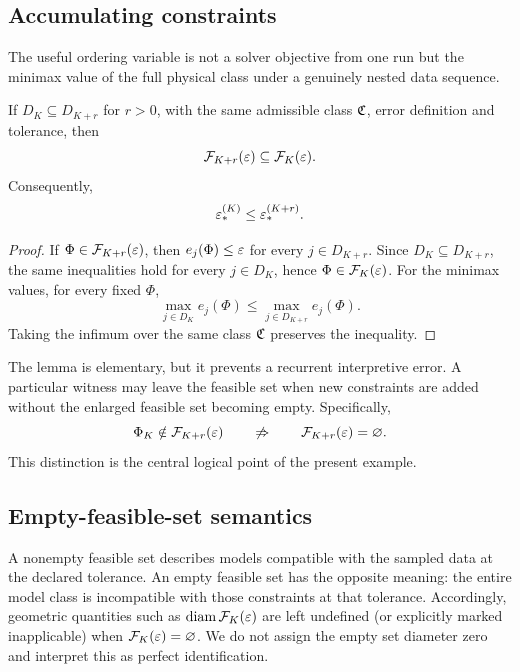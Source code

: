 \subsection{Accumulating constraints}

The useful ordering variable is not a solver objective from one run but the minimax value of the full physical class under a genuinely nested data sequence.

\begin{lemma}
\label{lem:nesting}
If $D_K\subseteq D_{K+r}$ for $r>0$, with the same admissible class $\mathfrak C$, error definition and tolerance, then
\begin{equation}
\mathcal F_{K+r}(\varepsilon)\subseteq\mathcal F_K(\varepsilon).
\label{eq:set-nesting}
\end{equation}
Consequently,
\begin{equation}
\varepsilon_*^{(K)}\le\varepsilon_*^{(K+r)}.
\label{eq:minimax-monotonicity}
\end{equation}
\end{lemma}

\begin{proof}
If $\Phi\in\mathcal F_{K+r}(\varepsilon)$, then $e_j(\Phi)\le\varepsilon$ for every $j\in D_{K+r}$.  Since $D_K\subseteq D_{K+r}$, the same inequalities hold for every $j\in D_K$, hence $\Phi\in\mathcal F_K(\varepsilon)$.  For the minimax values, for every fixed $\Phi$,
\[
\max_{j\in D_K}e_j(\Phi)
\le
\max_{j\in D_{K+r}}e_j(\Phi).
\]
Taking the infimum over the same class $\mathfrak C$ preserves the inequality.
\end{proof}

The lemma is elementary, but it prevents a recurrent interpretive error.  A particular witness may leave the feasible set when new constraints are added without the enlarged feasible set becoming empty.  Specifically,
\begin{equation}
\Phi_K\notin\mathcal F_{K+r}(\varepsilon)
\qquad\not\Rightarrow\qquad
\mathcal F_{K+r}(\varepsilon)=\varnothing.
\label{eq:witness-not-class}
\end{equation}
This distinction is the central logical point of the present example.

\subsection{Empty-feasible-set semantics}

A nonempty feasible set describes models compatible with the sampled data at the declared tolerance.  An empty feasible set has the opposite meaning: the entire model class is incompatible with those constraints at that tolerance.  Accordingly, geometric quantities such as $\operatorname{diam}\mathcal F_K(\varepsilon)$ are left undefined (or explicitly marked inapplicable) when $\mathcal F_K(\varepsilon)=\varnothing$.  We do not assign the empty set diameter zero and interpret this as perfect identification.

